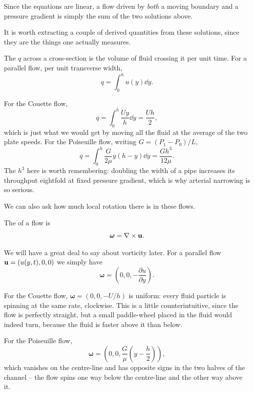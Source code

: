 \documentclass[a4paper]{scrartcl}
\newcommand{\pd}[2]{\frac{\partial #1}{\partial #2}}
\newcommand{\bom}{\boldsymbol{\omega}}
\begin{document}
Since the equations are linear, a flow driven by \emph{both} a moving boundary and a pressure gradient is simply the sum of the two solutions above.

It is worth extracting a couple of derived quantities from these solutions, since they are the things one actually measures.

\begin{definition}
	The  $q$ across a cross-section is the volume of fluid crossing it per unit time. For a parallel flow, per unit transverse width,
	$$
	q = \int_0^h u(y) \dd y.
	$$
\end{definition}

\begin{example}
	For the Couette flow,
	$$
	q = \int_0^h \frac{Uy}{h} \dd y = \frac{Uh}{2},
	$$
	which is just what we would get by moving all the fluid at the average of the two plate speeds. For the Poiseuille flow, writing $G = (P_1 - P_0)/L$,
	$$
	q = \int_0^h \frac{G}{2\mu} y(h-y) \dd y = \frac{Gh^3}{12\mu}.
	$$
	The $h^3$ here is worth remembering: doubling the width of a pipe increases its throughput eightfold at fixed pressure gradient, which is why arterial narrowing is so serious.
\end{example}

We can also ask how much local rotation there is in these flows.

\begin{definition}[Vorticity]
	The  of a flow is
	$$
	\bom = \nabla \times \vv u.
	$$
\end{definition}

We will have a great deal to say about vorticity later. For a parallel flow $\mathbf{u} = (u(y,t), 0, 0)$ we simply have
$$
\bom = \left(0, 0, -\pd{u}{y}\right).
$$

\begin{example}
	For the Couette flow, $\bom = (0, 0, -U/h)$ is uniform: every fluid particle is spinning at the same rate, clockwise. This is a little counterintuitive, since the flow is perfectly straight, but a small paddle-wheel placed in the fluid would indeed turn, because the fluid is faster above it than below.

	For the Poiseuille flow,
	$$
	\bom = \left(0, 0, \frac{G}{\mu}\left(y - \frac{h}{2}\right)\right),
	$$
	which vanishes on the centre-line and has opposite signs in the two halves of the channel -- the flow spins one way below the centre-line and the other way above it.
\end{example}
\end{document}

